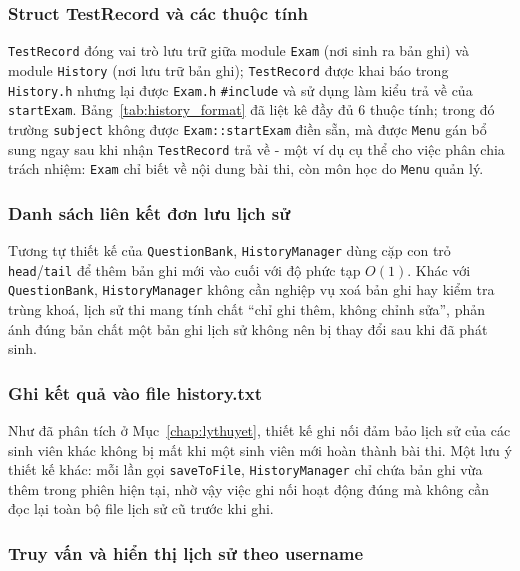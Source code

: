 \documentclass[11pt]{report}
\begin{document}
\subsubsection{Struct TestRecord và các thuộc tính}

\texttt{TestRecord} đóng vai trò lưu trữ giữa module \texttt{Exam} (nơi sinh ra bản ghi) và module \texttt{History} (nơi lưu trữ bản ghi); \texttt{TestRecord} được khai báo trong \texttt{History.h} nhưng lại được \texttt{Exam.h} \texttt{\#include} và sử dụng làm kiểu trả về của \texttt{startExam}. Bảng~\ref{tab:history_format} đã liệt kê đầy đủ 6 thuộc tính; trong đó trường \texttt{subject} không được \texttt{Exam::startExam} điền sẵn, mà được \texttt{Menu} gán bổ sung ngay sau khi nhận \texttt{TestRecord} trả về - một ví dụ cụ thể cho việc phân chia trách nhiệm: \texttt{Exam} chỉ biết về nội dung bài thi, còn môn học do \texttt{Menu} quản lý.

\subsubsection{Danh sách liên kết đơn lưu lịch sử}

Tương tự thiết kế của \texttt{QuestionBank}, \texttt{HistoryManager} dùng cặp con trỏ \texttt{head}/\texttt{tail} để thêm bản ghi mới vào cuối với độ phức tạp $O(1)$. Khác với \texttt{QuestionBank}, \texttt{HistoryManager} không cần nghiệp vụ xoá bản ghi hay kiểm tra trùng khoá, lịch sử thi mang tính chất ``chỉ ghi thêm, không chỉnh sửa'', phản ánh đúng bản chất một bản ghi lịch sử không nên bị thay đổi sau khi đã phát sinh.

\subsubsection{Ghi kết quả vào file history.txt}

Như đã phân tích ở Mục~\ref{chap:lythuyet}, thiết kế ghi nối đảm bảo lịch sử của các sinh viên khác không bị mất khi một sinh viên mới hoàn thành bài thi. Một lưu ý thiết kế khác: mỗi lần gọi \texttt{saveToFile}, \texttt{HistoryManager} chỉ chứa bản ghi vừa thêm trong phiên hiện tại, nhờ vậy việc ghi nối hoạt động đúng mà không cần đọc lại toàn bộ file lịch sử cũ trước khi ghi.

\subsubsection{Truy vấn và hiển thị lịch sử theo username}
\end{document}
